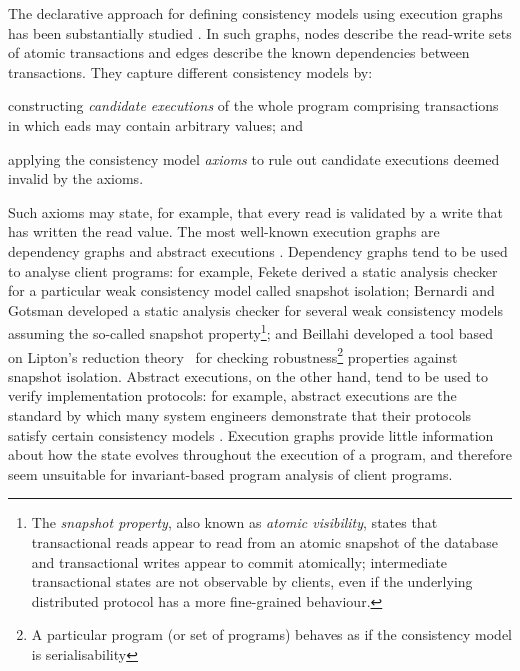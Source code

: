 The declarative approach for defining 
consistency models using execution graphs has been substantially
studied \cite{adya,ev_transactions,framework-concur,SIanalysis,laws}. 
In such graphs, nodes describe the read-write sets of  atomic transactions and edges describe the
known dependencies between transactions.
They capture different consistency models by:
\begin{enumerate*}
	\item constructing  \emph{candidate executions} of the whole program comprising
transactions in which eads may contain arbitrary values; and 
	\item applying the consistency model \emph{axioms} to rule out candidate executions deemed invalid by the axioms. 
\end{enumerate*}
Such axioms may state, for example, that every read is
validated by a write that has written the read value. 
The most well-known execution graphs are dependency graphs \cite{adya} and abstract
executions \cite{ev_transactions,framework-concur}. 
Dependency graphs tend to be used to analyse  client programs: for
example, 
Fekete \etal\citet{fekete-tods} derived 
a static analysis checker for a particular weak consistency model called
snapshot isolation;  Bernardi and Gotsman \citet{giovanni_concur16}
developed a static analysis checker for several weak consistency
models assuming the so-called snapshot property\footnote{The \emph{snapshot property}, 
also known as \emph{atomic visibility}, states that transactional reads appear to read from an atomic snapshot
of the database and transactional writes appear to commit atomically;  \ie intermediate transactional states are not observable by clients, 
even if the underlying distributed protocol has a more fine-grained behaviour.}; and 
Beillahi \etal\citep{snapshot-isolation-robust-tool} developed a tool based on Lipton's reduction theory~\cite{Lipton-reduction}
for checking robustness\footnote{A particular program (or set of programs) behaves as if the consistency model is serialisability} properties against snapshot isolation.
Abstract executions, on the other hand, tend to be used to verify  implementation protocols: for example,
abstract executions are the  standard by which many system engineers
demonstrate that their protocols satisfy  certain
consistency models \cite{cops,NMSI,PSI}. 
Execution graphs provide little information about how the 
state evolves throughout the execution of a program, and 
therefore seem  unsuitable for invariant-based program analysis 
of client programs. 


